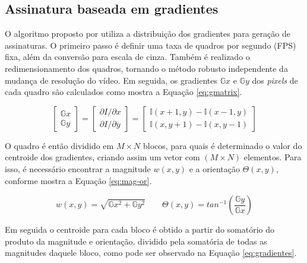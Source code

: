%
%


\subsection{Assinatura baseada em gradientes}
\label{sec:gradientes}

	O algoritmo proposto por \citeauthor{lee2008robust} utiliza a distribuição dos gradientes para geração de assinaturas. O primeiro passo é definir uma taxa de quadros por segundo (FPS) fixa, além da conversão para escala de cinza. Também é realizado o redimensionamento dos quadros, tornando o método robusto independente da mudança de resolução do vídeo. Em seguida, os gradientes $\mathbb{G}x$ e $\mathbb{G}y$ dos \textit{pixels} de cada quadro são calculados como mostra a Equação \ref{eq:gmatrix}.

\begin{equation}
  \label{eq:gmatrix}
  \begin{bmatrix}
    \mathbb{G}x
    \\ 
    \mathbb{G}y
  \end{bmatrix}= 
  \begin{bmatrix}
    \partial I/\partial x
    \\ 
    \partial I/\partial y
  \end{bmatrix}=
  \begin{bmatrix}
    \mathbb{I}(x+1, y) - \mathbb{I}(x-1,y)
    \\ 
    \mathbb{I}(x, y+1) - \mathbb{I}(x,y-1)
  \end{bmatrix}
\end{equation}
    
	O quadro é então dividido em $M\times N$ blocos, para quais é determinado o valor do centroide dos gradientes, criando assim um vetor com $(M \times N)$ elementos. Para isso, é necessário encontrar a magnitude \textit{$w(x,y)$} e a orientação \textit{$\Theta(x,y)$}, conforme mostra a Equação \ref{eq:mag-or}.
    
\begin{equation}
	\label{eq:mag-or}
    w(x,y) = \sqrt{\mathbb{G}x^{2} + \mathbb{G}y^{2}}
\qquad
\Theta(x,y) = tan^{-1}\left (\frac{\mathbb{G}y}{\mathbb{G}x} \right)
\end{equation}
    
    Em seguida o centroide para cada bloco é obtido a partir do somatório do produto da magnitude e orientação, dividido pela somatória de todas as magnitudes daquele bloco, como pode ser observado na Equação \ref{eq:gradientes}.
    
